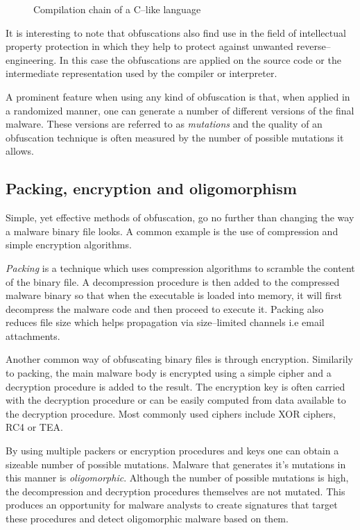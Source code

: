 \begin{figure}[H]
    \centering
    \caption{Compilation chain of a C--like language}
    \label{fig_comp}
\end{figure}

It is interesting to note that obfuscations also find use in the field of intellectual property protection in which they help to protect against unwanted reverse--engineering. In this case the obfuscations are applied on the source code or the intermediate representation used by the compiler or interpreter.

A prominent feature when using any kind of obfuscation is that, when applied in a randomized manner, one can generate a number of different versions of the final malware. These versions are referred to as \emph{mutations} and the quality of an obfuscation technique is often measured by the number of possible mutations it allows.

\subsection{Packing, encryption and oligomorphism}
Simple, yet effective methods of obfuscation, go no further than changing the way a malware binary file looks. A common example is the use of compression and simple encryption algorithms.

\emph{Packing} is a technique which uses compression algorithms to scramble the content of the binary file\cite{Symatec08}. A decompression procedure is then added to the compressed malware binary so that when the executable is loaded into memory, it will first decompress the malware code and then proceed to execute it. Packing also reduces file size which helps propagation via size--limited channels i.e email attachments. 

Another common way of obfuscating binary files is through encryption. Similarily to packing, the main malware body is encrypted using a simple cipher and a decryption procedure is added to the result. The encryption key is often carried with the decryption procedure or can be easily computed from data available to the decryption procedure. Most commonly used ciphers include XOR ciphers, RC4 or TEA. 

By using multiple packers or encryption procedures and keys one can obtain a sizeable number of possible mutations. Malware that generates it's mutations in this manner is \emph{oligomorphic}. Although the number of possible mutations is high, the decompression and decryption procedures themselves are not mutated. This produces an opportunity for malware analysts to create signatures that target these procedures and detect oligomorphic malware based on them.

